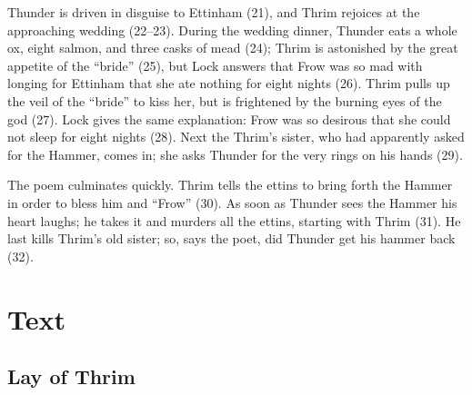 Thunder is driven in disguise to Ettinham (21), and Thrim rejoices at the approaching wedding (22--23).  During the wedding dinner, Thunder eats a whole ox, eight salmon, and three casks of mead (24); Thrim is astonished by the great appetite of the “bride” (25), but Lock answers that Frow was so mad with longing for Ettinham that she ate nothing for eight nights (26).  Thrim pulls up the veil of the “bride” to kiss her, but is frightened by the burning eyes of the god (27).  Lock gives the same explanation: Frow was so desirous that she could not sleep for eight nights (28).  Next the Thrim’s sister, who had apparently asked for the Hammer, comes in; she asks Thunder for the very rings on his hands (29).

The poem culminates quickly.  Thrim tells the ettins to bring forth the Hammer in order to bless him and “Frow” (30).  As soon as Thunder sees the Hammer his heart laughs; he takes it and murders all the ettins, starting with Thrim (31).  He last kills Thrim’s old sister; so, says the poet, did Thunder get his hammer back (32).

\sectionline

\newpage

\section{Text}

\subsection{Lay of Thrim}

